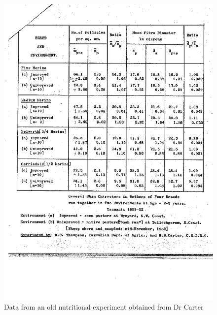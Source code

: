 %

\begin{figure}[h]
  \centering
   \includegraphics[width=1.1\textwidth]{carter51a.png}
  \caption{Data from an old nutritional experiment obtained from Dr Carter}
  \label{fig:thomcart1}
\end{figure}

%

